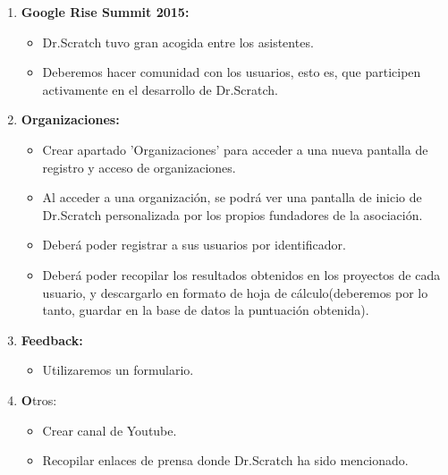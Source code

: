 \documentclass[a4paper,12pt]{letter}
\begin{document}
\begin{letter}
\begin{enumerate}
    
    \item {\textbf {Google Rise Summit 2015:}}
    
    \begin{itemize}
    Se comentaron los aspectos más importantes recogidos en el evento Google Rise Summit 2015.
        \item {Dr.Scratch tuvo gran acogida entre los asistentes.}
        \item {Deberemos hacer comunidad con los usuarios, esto es, que participen activamente en el desarrollo de Dr.Scratch.}
    \end{itemize}

    \item{\textbf {Organizaciones:}}
    
    \begin{itemize}
    Como consecuencia del punto anterior, se ha priorizado el desarrollo de una nueva funcionalidad para Dr.Scratch: registro de organizaciones. Para ello deberemos hacer lo siguiente:
        \item {Crear apartado 'Organizaciones' para acceder a una nueva pantalla de registro y acceso de organizaciones.}
        \item {Al acceder a una organización, se podrá ver una pantalla de inicio de Dr.Scratch personalizada por los propios fundadores de la asociación.}
        \item {Deberá poder registrar a sus usuarios por identificador.}
         \item {Deberá poder recopilar los resultados obtenidos en los proyectos de cada usuario, y descargarlo en formato de hoja de cálculo(deberemos por lo tanto, guardar en la base de datos la puntuación obtenida).}

    \end{itemize}

	\item{\textbf {Feedback:}}
    \begin{itemize}
    Deberemos disponer de una funcionalidad que facilite a los usuarios enviarnos algún tipo de realimentación sobre la herramienta.
        \item {Utilizaremos un formulario.}
    \end{itemize}
\vspace{0.5cm}
    \item {\textbf Otros:}
        \begin{itemize}
            \item {Crear canal de Youtube.}
            \item {Recopilar enlaces de prensa donde Dr.Scratch ha sido mencionado.}
        \end{itemize}
\end{enumerate}



\end{letter}
\end{document}
